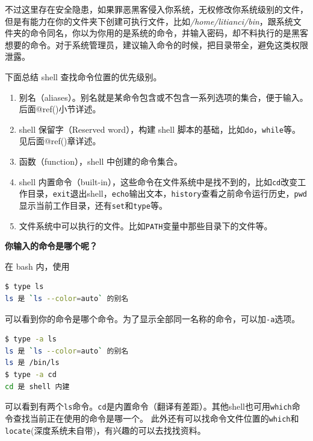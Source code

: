 \documentclass[doctor,openright,twoside]{sjtuthesis}
\providecommand{\tightlist}{%
    \setlength{\itemsep}{0pt}\setlength{\parskip}{0pt}}
\newcommand{\passthrough}[1]{#1}
\theoremstyle{plain}
\theoremstyle{definition}
\theoremstyle{remark}
\theoremstyle{ocrenumbox}
\theoremstyle{plain}
\begin{document}
不过这里存在安全隐患，如果罪恶黑客侵入你系统，无权修改你系统级别的文件，但是有能力在你的文件夹下创建可执行文件，比如\emph{/home/litianci/bin}，跟系统文件夹的命令同名，你以为你用的是系统的命令，并输入密码，却不料执行的是黑客想要的命令。对于系统管理员，建议输入命令的时候，把目录带全，避免这类权限泄露。

下面总结 shell 查找命令位置的优先级别。

\begin{enumerate}
\def\labelenumi{\arabic{enumi}.}
\tightlist
\item
  别名（aliases）。别名就是某命令包含或不包含一系列选项的集合，便于输入。后面@ref()小节详述。
\item
  shell 保留字（Reserved word），构建 shell 脚本的基础，比如\passthrough{\lstinline!do!}，\passthrough{\lstinline!while!}等。见后面@ref()章详述。
\item
  函数（function），shell 中创建的命令集合。
\item
  shell 内置命令（built-in），这些命令在文件系统中是找不到的，比如\passthrough{\lstinline!cd!}改变工作目录，\passthrough{\lstinline!exit!}退出shell，\passthrough{\lstinline!echo!}输出文本，\passthrough{\lstinline!history!}查看之前命令运行历史，\passthrough{\lstinline!pwd!}显示当前工作目录，还有\passthrough{\lstinline!set!}和\passthrough{\lstinline!type!}等。
\item
  文件系统中可以执行的文件。比如\passthrough{\lstinline!PATH!}变量中那些目录下的文件等。
\end{enumerate}

\textbf{你输入的命令是哪个呢？}

在 bash 内，使用

\begin{lstlisting}[language=bash]
$ type ls
ls 是 `ls --color=auto` 的别名
\end{lstlisting}

可以看到你的命令是哪个命令。为了显示全部同一名称的命令，可以加\passthrough{\lstinline!-a!}选项。

\begin{lstlisting}[language=bash]
$ type -a ls
ls 是 `ls --color=auto` 的别名
ls 是 /bin/ls
$ type -a cd
cd 是 shell 内建
\end{lstlisting}

可以看到有两个\passthrough{\lstinline!ls!}命令。\passthrough{\lstinline!cd!}是内置命令（翻译有差距）。其他shell也可用\passthrough{\lstinline!which!}命令查找当前正在使用的命令是哪一个。
此外还有可以找命令文件位置的\passthrough{\lstinline!which!}和\passthrough{\lstinline!locate!}(深度系统未自带)，有兴趣的可以去找找资料。
\end{document}
